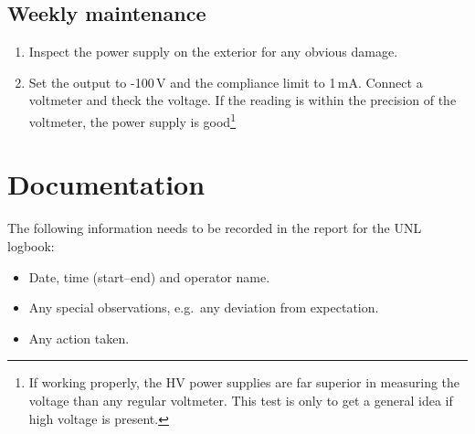 \documentclass[12pt]{unlsilabsop}
\begin{document}
\subsection{Weekly maintenance}
\begin{enumerate}
    \item Inspect the power supply on the exterior for any obvious damage.
    \item Set the output to -100\,V and the compliance limit to 1\,mA. Connect a voltmeter and theck the voltage. If the reading is within the precision of the voltmeter, the power supply is good\footnote{If working properly, the HV power supplies are far superior in measuring the voltage than any regular voltmeter. This test is only to get a general idea if high voltage is present.}
\end{enumerate}

\section{Documentation}
The following information needs to be recorded in the report for the UNL logbook:
\begin{itemize}
    \item Date, time (start--end) and operator name.
    \item Any special observations, e.g.~any deviation from expectation.
    \item Any action taken.
\end{itemize}
\end{document}
